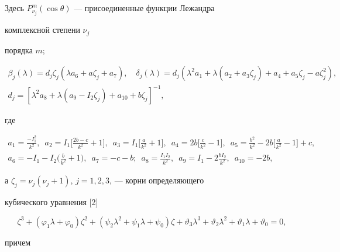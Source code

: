 \begin{exam}
Здесь $P^m_{\nu_j}(\cos\theta)$ --- присоединенные функции Лежандра 


комплексной степени $\nu_j$ 


порядка $m$; 


\begin{gather*} 


\beta_j(\lambda)=d_j\zeta_j(\lambda a_6+a\zeta_j+a_7),\quad 


\delta_j(\lambda)=d_j(\lambda^2a_1+\lambda(a_2+a_3\zeta_j)+ 


a_4+a_5\zeta_j-a\zeta^2_j), \\ 


% 


d_j=[\lambda^2a_8+\lambda(a_9-I_2\zeta_j)+ 


a_{10}+b\zeta_j]^{-1}, 


\end{gather*} 


где 


\begin{gather*} 


a_1=\frac{-I^2_1}{k^2},\ \; 


a_2=I_1\bigg[\frac{2b-c}{k^2}+1\bigg],\ \; 


a_3=I_1\bigg[\frac{a}{k^2}+1\bigg],\ \; 


a_4=2b\bigg[\frac{c}{k^2}-1\bigg],\ \; 


a_5=\frac{b^2}{k^2}-2b\bigg[\frac{a}{k^2}-1\bigg]+c, \\ 


% 


a_6=-I_1-I_2\bigg(\frac{b}{k^2}+1\bigg),\ \; 


a_7=-c-b;\ \; a_8=\frac{I_1I_2}{k^2}, 


\ \; a_9=I_1-2\frac{b I_2}{k^2},\ \; a_{10}=-2b, 


\end{gather*} 


а $\zeta_j=\nu_j(\nu_j+1)$, $j=1,2,3$, --- корни определяющего 


кубического уравнения [2] 


$$ 


\zeta^3+(\varphi_1\lambda+\varphi_0)\zeta^2+ 


(\psi_2\lambda^2+\psi_1\lambda+\psi_0)\zeta+ 


\vartheta_3\lambda^3+\vartheta_2\lambda^2


+\vartheta_1\lambda+\vartheta_0=0, 


$$ 


причем 



\end{exam}
